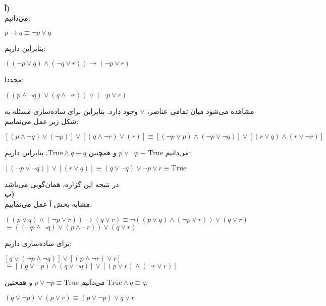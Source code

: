\\[0.1in]
\textbf{آ)}\\[0.1in]
می‌دانیم:
\begin{center}
    $p \rightarrow q \equiv \neg p \vee q$\\
\end{center}
بنابراین داریم:
\begin{center}
    $((\neg p \vee q) \wedge (\neg q \vee r)) \rightarrow
    (\neg p \vee r)$
\end{center}
مجددا:
\begin{center}
    $((p \wedge \neg q) \vee (q \wedge \neg r))
    \vee (\neg p \vee r)$
\end{center}
مشاهده می‌شود میان تمامی عناصر، $\vee$ وجود دارد. بنابراین برای ساده‌سازی مسئله به شکل زیر عمل می‌نماییم:
\begin{center}
    $[(p \wedge \neg q) \vee (\neg p)] \vee
    [(q \wedge \neg r) \vee (r)] \equiv
    [(\neg p \vee p) \wedge (\neg p \vee \neg q)] \vee
    [(r \vee q) \wedge (r \vee \neg r)]$
\end{center}
می‌دانیم $p \vee \neg p \equiv \text{True}$ و همچنین
$\text{True} \wedge q \equiv q$.
بنابراین داریم:
\begin{center}
    $[(\neg p \vee \neg q)] \vee [(r \vee q)] \equiv
    (q \vee \neg q) \vee \neg p \vee r \equiv
    \text{True}$
\end{center}
در نتیجه این گزاره، همان‌گویی می‌باشد.\\[0.25in]
\textbf{ب)}\\[0.1in]
مشابه بخش آ عمل می‌نماییم.\\
\begin{center}
    $((p \vee q) \wedge (\neg p \vee r)) \rightarrow
     (q \vee r) \equiv
     \neg ((p \vee q) \wedge (\neg p \vee r)) \vee 
     (q \vee r)$\\
     $\equiv ((\neg p \wedge \neg q) \vee (p \wedge \neg r)) 
     \vee (q \vee r)$
\end{center}
برای ساده‌سازی داریم:
\begin{center}
    $[q \vee (\neg p \wedge \neg q)] \vee
    [(p \wedge \neg r) \vee r]$\\
    $\equiv
    [(q \vee \neg p) \wedge (q \vee \neg q)] \vee
    [(p \vee r) \wedge (\neg r \vee r)]$
\end{center}
می‌دانیم $p \vee \neg p \equiv \text{True}$ و همچنین
$\text{True} \wedge q \equiv q$.
\begin{center}
    $(q \vee \neg p) \vee (p \vee r) \equiv
    (p \vee \neg p) \vee q \vee r$
\end{center}
